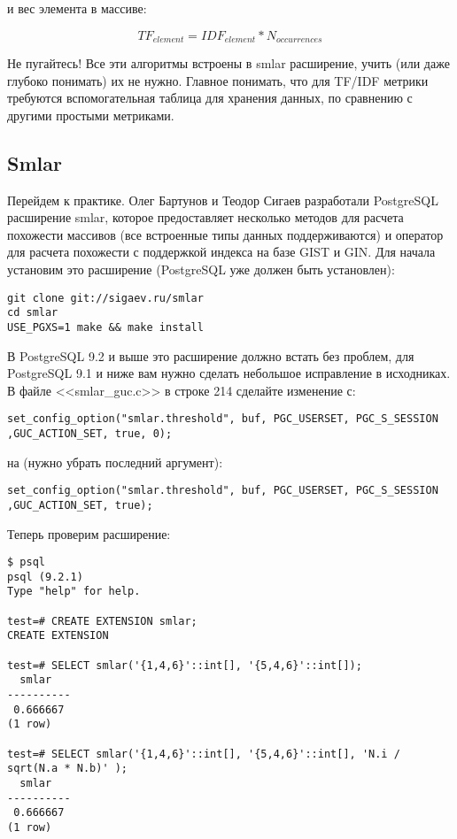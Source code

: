 и вес элемента в массиве:

\begin{equation}
 \label{eq:smlar6}
 TF_{element} = IDF_{element} * N_{occurrences}
\end{equation}

Не пугайтесь! Все эти алгоритмы встроены в smlar расширение, учить (или даже глубоко понимать) их не нужно. Главное понимать, что для TF/IDF метрики требуются вспомогательная таблица для хранения данных, по сравнению с другими простыми метриками.

\subsection{Smlar}

Перейдем к практике. Олег Бартунов и Теодор Сигаев разработали PostgreSQL расширение smlar, которое предоставляет несколько методов для расчета похожести массивов (все встроенные типы данных поддерживаются) и оператор для расчета похожести с поддержкой индекса на базе GIST и GIN. Для начала установим это расширение (PostgreSQL уже должен быть установлен):

\begin{lstlisting}[label=lst:smlar1,caption=Установка smlar]
git clone git://sigaev.ru/smlar
cd smlar
USE_PGXS=1 make && make install
\end{lstlisting}

В PostgreSQL 9.2 и выше это расширение должно встать без проблем, для PostgreSQL 9.1 и ниже вам нужно сделать небольшое исправление в исходниках. В файле <<smlar\_guc.c>> в строке 214 сделайте изменение с:

\begin{lstlisting}[label=lst:smlar2,caption=Фикс для 9.1 и ниже]
set_config_option("smlar.threshold", buf, PGC_USERSET, PGC_S_SESSION ,GUC_ACTION_SET, true, 0);
\end{lstlisting}

на (нужно убрать последний аргумент):

\begin{lstlisting}[label=lst:smlar3,caption=Фикс для 9.1 и ниже]
set_config_option("smlar.threshold", buf, PGC_USERSET, PGC_S_SESSION ,GUC_ACTION_SET, true);
\end{lstlisting}

Теперь проверим расширение:

\begin{lstlisting}[label=lst:smlar4,caption=Проверка smlar]
$ psql
psql (9.2.1)
Type "help" for help.

test=# CREATE EXTENSION smlar;
CREATE EXTENSION

test=# SELECT smlar('{1,4,6}'::int[], '{5,4,6}'::int[]);
  smlar
----------
 0.666667
(1 row)

test=# SELECT smlar('{1,4,6}'::int[], '{5,4,6}'::int[], 'N.i / sqrt(N.a * N.b)' );
  smlar
----------
 0.666667
(1 row)
\end{lstlisting}

